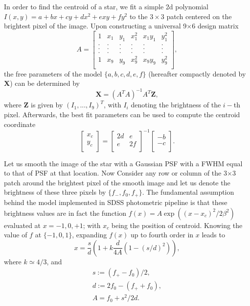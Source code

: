 \documentclass[12pt, preprint]{aastex}
\newcommand{\beq}{\begin{equation}}
\newcommand{\eeq}{\end{equation}}
\begin{document}
In order to find the centroid of a star, we fit a simple 2d polynomial $I(x,y)=a+bx+cy+dx^2+exy+fy^2$ to the $3\times3$ patch centered on the brightest pixel of the
image. Upon constructing a universal 9$\times$6 design matrix
\[
A=
  \begin{bmatrix}
    1 & x_{1} & y_{1} & x_{1}^{2} & x_{1}y_{1} & y_{1}^{2}\\
    . & . & . & . & . & . \\
    . & . & . & . & . & . \\
    . & . & . & . & . & . \\
    1 & x_{9} & y_{9} & x_{9}^{2} & x_{9}y_{9} & y_{9}^{2}\\
  \end{bmatrix},
\]
the free parameters of the model $\{a,b,c,d,e,f\}$ (hereafter compactly denoted by $\mathbf{X}$) can be determined by 
\beq
\mathbf{X} = (A^{T}A)^{-1}A^{T}\mathbf{Z},
\eeq  
where $\mathbf{Z}$ is given by $(I_{1},...,I_{9})^{T}$, with $I_{i}$ denoting the brightness of the $i-$th pixel. Afterwards, the best fit parameters can be used to compute the centroid coordinate
\[
  \begin{bmatrix}
    x_{c}\\
    y_{c}\\
  \end{bmatrix} = \begin{bmatrix}
    2d & e\\
    e & 2f\\
  \end{bmatrix}^{-1}\begin{bmatrix}
    -b\\
    -c\\
  \end{bmatrix}.
\]

Let us smooth the image of the star with a Gaussian PSF with a FWHM equal to that of PSF at that location. Now Consider any row or column of the 3$\times$3 patch around the brightest pixel of the smooth image and let us denote the brightness of these three pixels by $\{f_{-},f_{0},f_{+}\}$. The fundamental assumption behind the model implemented in SDSS photometric pipeline \citep{sdss} is that these brightness values are in fact the function $f(x) = A\exp((x-x_{c})^{2}/2\beta^{2})$ evaluated at $x=-1,0,+1$; with $x_{c}$ being the position of centroid. Knowing the value of $f$ at $\{-1,0,1\}$, expanding $f(x)$ up to fourth order in $x$ leads to
\beq
x = \frac{s}{d}(1+k\frac{d}{4A}(1-(s/d)^{2})),
\eeq
where $k \simeq 4/3$, and
\beq
\begin{array}{l}
s:=(f_{+}-f_{0})/2, \nonumber\\
d:=2f_{0} - (f_{+}+f_{0}), \nonumber\\
A = f_{0} +s^{2}/2d.
\label{def}
\end{array}
\eeq 
\end{document}
